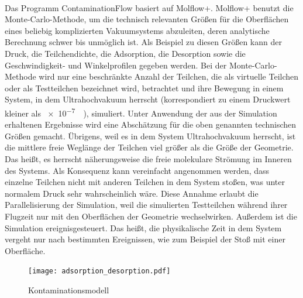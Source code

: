 \documentclass{listhesis}
\begin{document}
\paragraph{}
Das Programm ContaminationFlow basiert auf Molflow+. Molflow+ benutzt die Monte-Carlo-Methode, um die technisch relevanten Größen für die Oberflächen eines beliebig komplizierten Vakuumsystems abzuleiten, deren analytische Berechnung schwer bis unmöglich ist. Als Beispiel zu diesen Größen kann der Druck, die Teilchendichte, die Adsorption, die Desorption sowie die Geschwindigkeit- und Winkelprofilen gegeben werden. Bei der Monte-Carlo-Methode wird nur eine beschränkte Anzahl der Teilchen, die als virtuelle Teilchen oder als Testteilchen bezeichnet wird, betrachtet und ihre Bewegung in einem System, in dem Ultrahochvakuum herrscht (korrespondiert zu einem Druckwert kleiner als \SI{e-7}{\milli\Bar}), simuliert. Unter Anwendung der aus der Simulation erhaltenen Ergebnisse wird eine Abschätzung für die oben genannten technischen Größen gemacht. Übrigens, weil es in dem System Ultrahochvakuum herrscht, ist die mittlere freie Weglänge der Teilchen viel größer als die Größe der Geometrie. Das heißt, es herrscht näherungsweise die freie molekulare Strömung im Inneren des Systems. Als Konsequenz kann vereinfacht angenommen werden, dass einzelne Teilchen nicht mit anderen Teilchen in dem System stoßen, was unter normalem Druck sehr wahrscheinlich wäre. Diese Annahme erlaubt die Parallelisierung der Simulation, weil die simulierten Testteilchen während ihrer Flugzeit nur mit den Oberflächen der Geometrie wechselwirken. Außerdem ist die Simulation ereignisgesteuert. Das heißt, die physikalische Zeit in dem System vergeht nur nach bestimmten Ereignissen, wie zum Beispiel der Stoß mit einer Oberfläche. 

\begin{figure}[]
\centering
\texttt{[image: adsorption\_desorption.pdf]}
\caption{Kontaminationsmodell}
\label{fig:model}
\end{figure}
\end{document}
